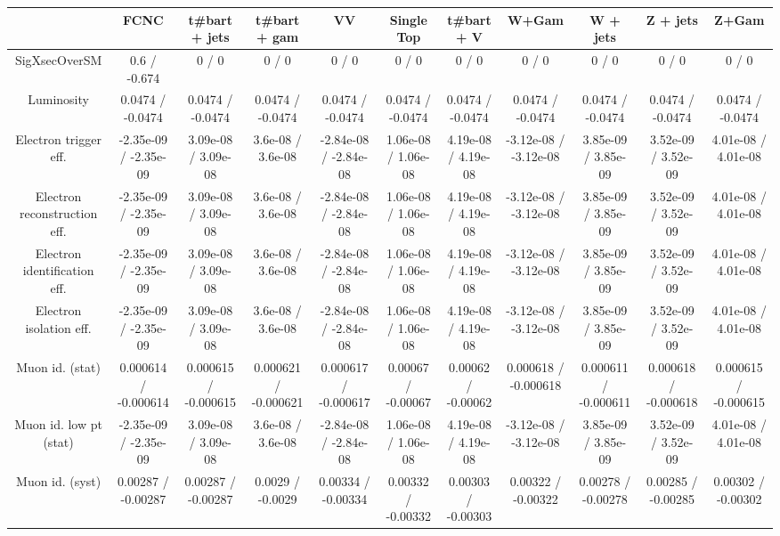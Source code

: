 \begin{table}[htbp]
\begin{center}
\footnotesize
\begin{tabular}{|c|c|c|c|c|c|c|c|c|c|c|}
\hline 
      & FCNC      & t#bar{t} + jets      & t#bar{t} +  gam      & VV      & Single Top      & t#bar{t} + V      & W+Gam      & W + jets      & Z + jets      & Z+Gam \\ 
\hline 
 SigXsecOverSM & 0.6 / -0.674 & 0 / 0 & 0 / 0 & 0 / 0 & 0 / 0 & 0 / 0 & 0 / 0 & 0 / 0 & 0 / 0 & 0 / 0 \\ 
  Luminosity & 0.0474 / -0.0474 & 0.0474 / -0.0474 & 0.0474 / -0.0474 & 0.0474 / -0.0474 & 0.0474 / -0.0474 & 0.0474 / -0.0474 & 0.0474 / -0.0474 & 0.0474 / -0.0474 & 0.0474 / -0.0474 & 0.0474 / -0.0474 \\ 
  Electron trigger eff. & -2.35e-09 / -2.35e-09 & 3.09e-08 / 3.09e-08 & 3.6e-08 / 3.6e-08 & -2.84e-08 / -2.84e-08 & 1.06e-08 / 1.06e-08 & 4.19e-08 / 4.19e-08 & -3.12e-08 / -3.12e-08 & 3.85e-09 / 3.85e-09 & 3.52e-09 / 3.52e-09 & 4.01e-08 / 4.01e-08 \\ 
  Electron reconstruction eff. & -2.35e-09 / -2.35e-09 & 3.09e-08 / 3.09e-08 & 3.6e-08 / 3.6e-08 & -2.84e-08 / -2.84e-08 & 1.06e-08 / 1.06e-08 & 4.19e-08 / 4.19e-08 & -3.12e-08 / -3.12e-08 & 3.85e-09 / 3.85e-09 & 3.52e-09 / 3.52e-09 & 4.01e-08 / 4.01e-08 \\ 
  Electron identification eff. & -2.35e-09 / -2.35e-09 & 3.09e-08 / 3.09e-08 & 3.6e-08 / 3.6e-08 & -2.84e-08 / -2.84e-08 & 1.06e-08 / 1.06e-08 & 4.19e-08 / 4.19e-08 & -3.12e-08 / -3.12e-08 & 3.85e-09 / 3.85e-09 & 3.52e-09 / 3.52e-09 & 4.01e-08 / 4.01e-08 \\ 
  Electron isolation eff. & -2.35e-09 / -2.35e-09 & 3.09e-08 / 3.09e-08 & 3.6e-08 / 3.6e-08 & -2.84e-08 / -2.84e-08 & 1.06e-08 / 1.06e-08 & 4.19e-08 / 4.19e-08 & -3.12e-08 / -3.12e-08 & 3.85e-09 / 3.85e-09 & 3.52e-09 / 3.52e-09 & 4.01e-08 / 4.01e-08 \\ 
  Muon id. (stat) & 0.000614 / -0.000614 & 0.000615 / -0.000615 & 0.000621 / -0.000621 & 0.000617 / -0.000617 & 0.00067 / -0.00067 & 0.00062 / -0.00062 & 0.000618 / -0.000618 & 0.000611 / -0.000611 & 0.000618 / -0.000618 & 0.000615 / -0.000615 \\ 
  Muon id. low pt (stat) & -2.35e-09 / -2.35e-09 & 3.09e-08 / 3.09e-08 & 3.6e-08 / 3.6e-08 & -2.84e-08 / -2.84e-08 & 1.06e-08 / 1.06e-08 & 4.19e-08 / 4.19e-08 & -3.12e-08 / -3.12e-08 & 3.85e-09 / 3.85e-09 & 3.52e-09 / 3.52e-09 & 4.01e-08 / 4.01e-08 \\ 
  Muon id. (syst) & 0.00287 / -0.00287 & 0.00287 / -0.00287 & 0.0029 / -0.0029 & 0.00334 / -0.00334 & 0.00332 / -0.00332 & 0.00303 / -0.00303 & 0.00322 / -0.00322 & 0.00278 / -0.00278 & 0.00285 / -0.00285 & 0.00302 / -0.00302 \\ 

\end{tabular}
\end{center}
\end{table}
